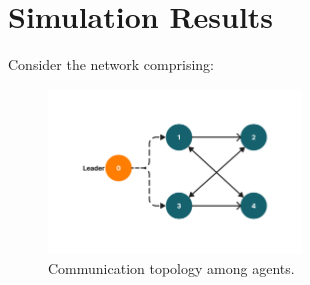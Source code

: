 \documentclass[journal,onecolumn]{IEEEtran}
\begin{document}

\section{Simulation Results}



Consider the network comprising:

\begin{figure}[H]
    \centering
    \includegraphics[width=0.6\textwidth]{communication.png}
    \caption{Communication topology among agents.}
    \label{fig:communication1} %
\end{figure}
\end{document}
